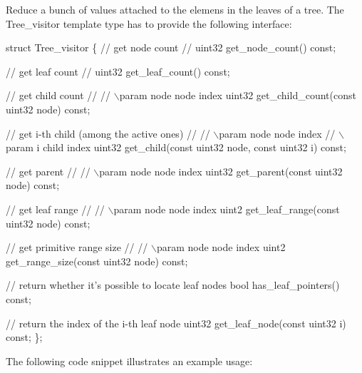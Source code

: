 Reduce a bunch of values attached to the elemens in the leaves of a tree. The Tree\+\_\+visitor template type has to provide the following interface\+:


\begin{DoxyCode}
\textcolor{keyword}{struct }Tree\_visitor
\{
    \textcolor{comment}{// get node count}
    \textcolor{comment}{//}
    uint32 get\_node\_count() \textcolor{keyword}{const};

    \textcolor{comment}{// get leaf count}
    \textcolor{comment}{//}
    uint32 get\_leaf\_count() \textcolor{keyword}{const};

    \textcolor{comment}{// get child count}
    \textcolor{comment}{//}
    \textcolor{comment}{// \(\backslash\)param node    node index}
    uint32 get\_child\_count(\textcolor{keyword}{const} uint32 node) \textcolor{keyword}{const};

    \textcolor{comment}{// get i-th child (among the active ones)}
    \textcolor{comment}{//}
    \textcolor{comment}{// \(\backslash\)param node    node index}
    \textcolor{comment}{// \(\backslash\)param i        child index}
    uint32 get\_child(\textcolor{keyword}{const} uint32 node, \textcolor{keyword}{const} uint32 i) \textcolor{keyword}{const};

    \textcolor{comment}{// get parent}
    \textcolor{comment}{//}
    \textcolor{comment}{// \(\backslash\)param node    node index}
    uint32 get\_parent(\textcolor{keyword}{const} uint32 node) \textcolor{keyword}{const};

    \textcolor{comment}{// get leaf range}
    \textcolor{comment}{//}
    \textcolor{comment}{// \(\backslash\)param node    node index}
    uint2 get\_leaf\_range(\textcolor{keyword}{const} uint32 node) \textcolor{keyword}{const};

    \textcolor{comment}{// get primitive range size}
    \textcolor{comment}{//}
    \textcolor{comment}{// \(\backslash\)param node    node index}
    uint2 get\_range\_size(\textcolor{keyword}{const} uint32 node) \textcolor{keyword}{const};

    \textcolor{comment}{// return whether it's possible to locate leaf nodes}
    \textcolor{keywordtype}{bool} has\_leaf\_pointers() \textcolor{keyword}{const};

    \textcolor{comment}{// return the index of the i-th leaf node}
    uint32 get\_leaf\_node(\textcolor{keyword}{const} uint32 i) \textcolor{keyword}{const};
\};
\end{DoxyCode}


The following code snippet illustrates an example usage\+:


